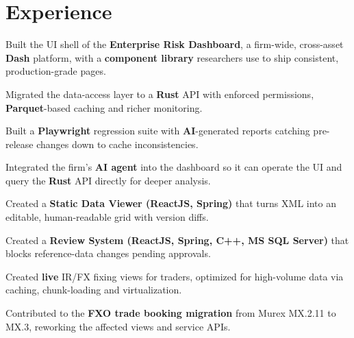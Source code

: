 \documentclass[]{plushcv}
\begin{document}
\begin{minipage}[t]{0.57\textwidth}



\section{Experience}
\vspace{\topsep} %
\begin{tightemize}
\sectionsep
\item Built the UI shell of the \textbf{Enterprise Risk Dashboard}, a firm-wide, cross-asset \textbf{Dash} platform, with a \textbf{component library} researchers use to ship consistent, production-grade pages.
\item Migrated the data-access layer to a \textbf{Rust} API with enforced permissions, \textbf{Parquet}-based caching and richer monitoring.
\item Built a \textbf{Playwright} regression suite with \textbf{AI}-generated reports catching pre-release changes down to cache inconsistencies.
\item Integrated the firm's \textbf{AI agent} into the dashboard so it can operate the UI and query the \textbf{Rust} API directly for deeper analysis.
\end{tightemize}
\sectionsep

\begin{tightemize}
\sectionsep
\item Created a \textbf{Static Data Viewer (ReactJS, Spring)} that turns XML into an editable, human-readable grid with version diffs.
\item Created a \textbf{Review System (ReactJS, Spring, C++, MS SQL Server)} that blocks reference-data changes pending approvals.
\item Created \textbf{live} IR/FX fixing views for traders, optimized for high-volume data via caching, chunk-loading and virtualization.
\item Contributed to the \textbf{FXO trade booking migration} from Murex MX.2.11 to MX.3, reworking the affected views and service APIs.
\end{tightemize}
\sectionsep


\end{minipage}
\end{document}
